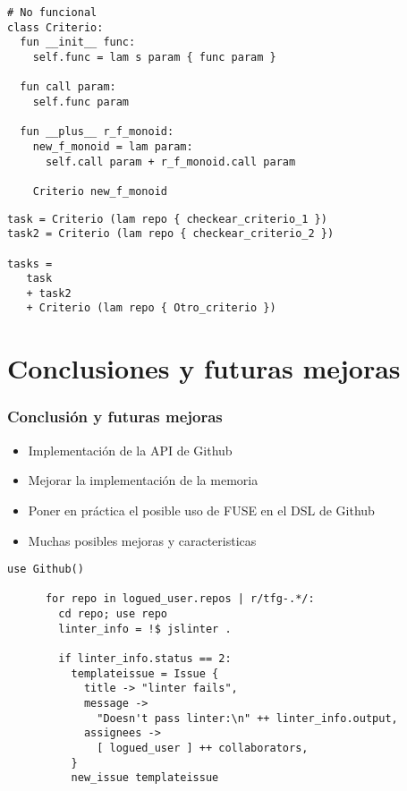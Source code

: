 \begin{frame}
  \framebreak{}
  \begin{center}
    \begin{lstlisting}[language=scriptflow]
# No funcional
class Criterio:
  fun __init__ func:
    self.func = lam s param { func param }

  fun call param:
    self.func param

  fun __plus__ r_f_monoid:
    new_f_monoid = lam param:
      self.call param + r_f_monoid.call param

    Criterio new_f_monoid
    \end{lstlisting}
  \end{center}

  \framebreak{}
  \begin{center}
    \begin{lstlisting}[language=scriptflow]
task = Criterio (lam repo { checkear_criterio_1 })
task2 = Criterio (lam repo { checkear_criterio_2 })

tasks =
   task
   + task2
   + Criterio (lam repo { Otro_criterio })
    \end{lstlisting}
  \end{center}
\end{frame}

\section{Conclusiones y futuras mejoras}
\begin{frame}
  \frametitle{Conclusión y futuras mejoras}
  \begin{center}
    \begin{itemize}
      \item Implementación de la API de Github
      \item Mejorar la implementación de la memoria
      \item Poner en práctica el posible uso de FUSE en el DSL de Github
      \item Muchas posibles mejoras y caracteristicas
    \end{itemize}
    \begin{lstlisting}[language=scriptflow2]
      use Github()

      for repo in logued_user.repos | r/tfg-.*/:
        cd repo; use repo
        linter_info = !$ jslinter .

        if linter_info.status == 2:
          templateissue = Issue {
            title -> "linter fails",
            message ->
              "Doesn't pass linter:\n" ++ linter_info.output,
            assignees ->
              [ logued_user ] ++ collaborators,
          }
          new_issue templateissue
    \end{lstlisting}
  \end{center}
\end{frame}

